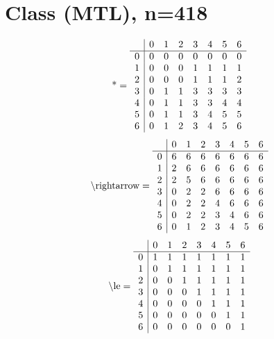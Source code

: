 \documentclass[11pt]{article}
\begin{document}
\section{Class (MTL), n=418}
\[\text{*} = 
\begin{array}{r | r r r r r r r}
 & 0 & 1 & 2 & 3 & 4 & 5 & 6 \\ \hline
0 & 0 & 0 & 0 & 0 & 0 & 0 & 0 \\
1 & 0 & 0 & 0 & 1 & 1 & 1 & 1 \\
2 & 0 & 0 & 0 & 1 & 1 & 1 & 2 \\
3 & 0 & 1 & 1 & 3 & 3 & 3 & 3 \\
4 & 0 & 1 & 1 & 3 & 3 & 4 & 4 \\
5 & 0 & 1 & 1 & 3 & 4 & 5 & 5 \\
6 & 0 & 1 & 2 & 3 & 4 & 5 & 6 \\
\end{array}
\]
\[\text{\textbackslash rightarrow} = 
\begin{array}{r | r r r r r r r}
 & 0 & 1 & 2 & 3 & 4 & 5 & 6 \\ \hline
0 & 6 & 6 & 6 & 6 & 6 & 6 & 6 \\
1 & 2 & 6 & 6 & 6 & 6 & 6 & 6 \\
2 & 2 & 5 & 6 & 6 & 6 & 6 & 6 \\
3 & 0 & 2 & 2 & 6 & 6 & 6 & 6 \\
4 & 0 & 2 & 2 & 4 & 6 & 6 & 6 \\
5 & 0 & 2 & 2 & 3 & 4 & 6 & 6 \\
6 & 0 & 1 & 2 & 3 & 4 & 5 & 6 \\
\end{array}
\]
\[\text{\textbackslash le} = 
\begin{array}{r | r r r r r r r}
 & 0 & 1 & 2 & 3 & 4 & 5 & 6 \\ \hline
0 & 1 & 1 & 1 & 1 & 1 & 1 & 1 \\
1 & 0 & 1 & 1 & 1 & 1 & 1 & 1 \\
2 & 0 & 0 & 1 & 1 & 1 & 1 & 1 \\
3 & 0 & 0 & 0 & 1 & 1 & 1 & 1 \\
4 & 0 & 0 & 0 & 0 & 1 & 1 & 1 \\
5 & 0 & 0 & 0 & 0 & 0 & 1 & 1 \\
6 & 0 & 0 & 0 & 0 & 0 & 0 & 1 \\
\end{array}
\]
\end{document}
